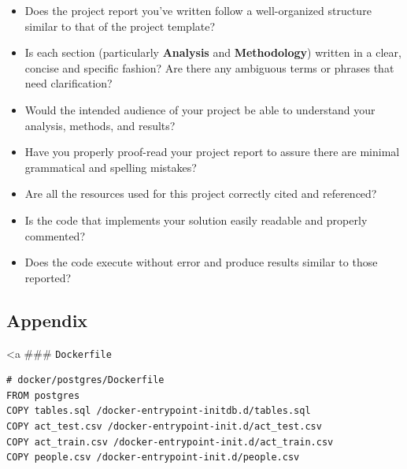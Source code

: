 \documentclass[]{report}
\begin{document}
\begin{itemize}
\itemsep1pt\parskip0pt
\item
  Does the project report you've written follow a well-organized
  structure similar to that of the project template?
\item
  Is each section (particularly \textbf{Analysis} and
  \textbf{Methodology}) written in a clear, concise and specific
  fashion? Are there any ambiguous terms or phrases that need
  clarification?
\item
  Would the intended audience of your project be able to understand your
  analysis, methods, and results?
\item
  Have you properly proof-read your project report to assure there are
  minimal grammatical and spelling mistakes?
\item
  Are all the resources used for this project correctly cited and
  referenced?
\item
  Is the code that implements your solution easily readable and properly
  commented?
\item
  Does the code execute without error and produce results similar to
  those reported?
\end{itemize}

\subsection{Appendix}\label{appendix}

\textless{}a \#\#\# \texttt{Dockerfile}

\begin{verbatim}
# docker/postgres/Dockerfile
FROM postgres
COPY tables.sql /docker-entrypoint-initdb.d/tables.sql
COPY act_test.csv /docker-entrypoint-init.d/act_test.csv
COPY act_train.csv /docker-entrypoint-init.d/act_train.csv
COPY people.csv /docker-entrypoint-init.d/people.csv
\end{verbatim}

\subsubsection{}\label{section}
\end{document}
